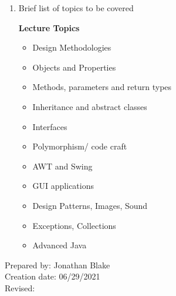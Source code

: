 \begin{enumerate}[1.]
\item Brief list of topics to be covered\\
  {\bfseries
    Lecture Topics
    \begin{itemize}
      \item Design Methodologies
      \item Objects and Properties
      \item Methods, parameters and return types
      \item Inheritance and abstract classes
      \item Interfaces
      \item Polymorphism/ code craft
      \item AWT and Swing
      \item GUI applications
      \item Design Patterns, Images, Sound
      \item Exceptions, Collections
      \item Advanced Java
    \end{itemize}
  }

\end{enumerate}

\noindent Prepared by: Jonathan Blake\\
\noindent Creation date: 06/29/2021\\
\noindent Revised:\\
